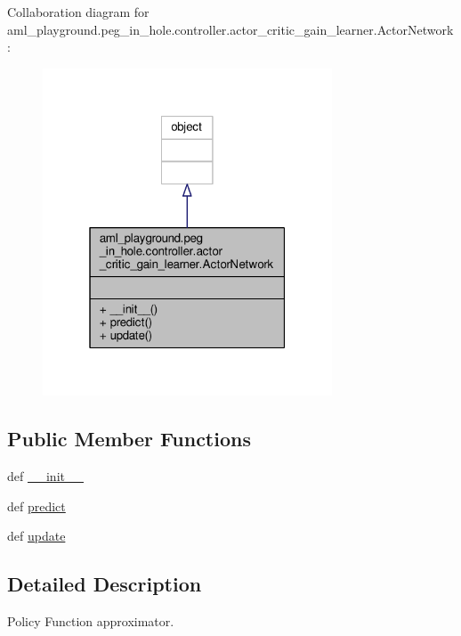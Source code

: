 Collaboration diagram for aml\-\_\-playground.\-peg\-\_\-in\-\_\-hole.\-controller.\-actor\-\_\-critic\-\_\-gain\-\_\-learner.\-Actor\-Network\-:
\nopagebreak
\begin{figure}[H]
\begin{center}
\leavevmode
\includegraphics[width=244pt]{classaml__playground_1_1peg__in__hole_1_1controller_1_1actor__critic__gain__learner_1_1_actor_network__coll__graph}
\end{center}
\end{figure}
\subsection*{Public Member Functions}
\begin{DoxyCompactItemize}
\item 
def \hyperlink{classaml__playground_1_1peg__in__hole_1_1controller_1_1actor__critic__gain__learner_1_1_actor_network_afa3a417664d78c7adb12280234bc3d09}{\-\_\-\-\_\-init\-\_\-\-\_\-}
\item 
def \hyperlink{classaml__playground_1_1peg__in__hole_1_1controller_1_1actor__critic__gain__learner_1_1_actor_network_ad99555156aa4081b18aef59f3b34fa5b}{predict}
\item 
def \hyperlink{classaml__playground_1_1peg__in__hole_1_1controller_1_1actor__critic__gain__learner_1_1_actor_network_a65410bf7de2cf2f3c4e28f52ef5ec299}{update}
\end{DoxyCompactItemize}


\subsection{Detailed Description}
\begin{DoxyVerb}Policy Function approximator. 
\end{DoxyVerb}
 

